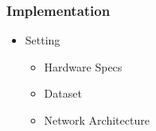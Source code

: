 \begin{frame}\frametitle{Implementation}
\begin{itemize}
\item Setting
\begin{itemize}
\item Hardware Specs
\item Dataset 
\item Network Architecture 
\end{itemize}
\end{itemize}


\end{frame}